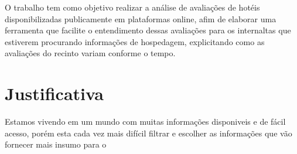 O trabalho tem como objetivo realizar a análise de avaliações de hotéis disponibilizadas publicamente em plataformas online, afim de elaborar uma ferramenta que facilite o entendimento dessas avaliações para os internaltas que estiverem procurando informações de hospedagem, explicitando como as avaliações do recinto variam conforme o tempo.

\begin{comment}
    como o sentimento dos usuários que avaliaram o estabelecimento variou durante o tempo, se o recinto está recebendo avaliações com sentimentos mais positivos ou se a tendência é de que as avaliações continuem com sentimentos cada vez mais negativos, e identificiar possíveis mudanças de comportamento, que para esses cenários podem ser justificados por mudanças de equipe, mudanças de políticas internas da empresa ou por uma simples manutenção ou evolução das instalações
    , afim de observar e entender as variações de sentimentos das avaliações realizadas pelos usuários da plataforma distribuidos durante o tempo.
\end{comment}

\section{Justificativa}

Estamos vivendo em um mundo com muitas informações disponiveis e de fácil acesso, porém esta cada vez mais difícil filtrar e escolher as informações que vão fornecer mais insumo para o 